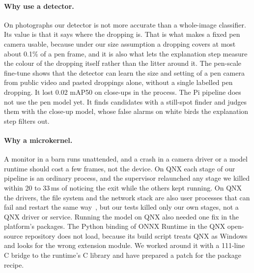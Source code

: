 \paragraph{Why use a detector.} On photographs our detector is not more accurate than a whole-image classifier. Its
value is that it says where the dropping is. That is what makes a fixed pen camera usable, because under our size
assumption a dropping covers at most about 0.1\% of a pen frame, and it is also what lets the explanation step
measure the colour of the dropping itself rather than the litter around it. The pen-scale fine-tune shows that the
detector can learn the size and setting of a pen camera from public video and pasted droppings alone, without a
single labelled pen dropping. It lost 0.02 mAP50 on close-ups in the process. The Pi pipeline does not use the pen model yet. It finds candidates with a still-spot finder and judges them with the close-up model, whose false
alarms on white birds the explanation step filters out.

\paragraph{Why a microkernel.} A monitor in a barn runs unattended, and a crash in a camera driver or a model runtime
should cost a few frames, not the device. On QNX each stage of our pipeline is an ordinary process, and the
supervisor relaunched any stage we killed within 20 to 33\,ms of noticing the exit while the others kept running. On QNX the drivers, the file system and the network stack are also user processes that can fail and restart the same way~\cite{qnx8sysarch}, but our tests killed only our own stages, not a QNX driver or service. Running the model on QNX also needed one fix in the platform's
packages. The Python binding of ONNX Runtime in the QNX open-source repository does not load, because its build
script treats QNX as Windows and looks for the wrong extension module. We worked around it with a 111-line C bridge
to the runtime's C library and have prepared a patch for the package recipe.

